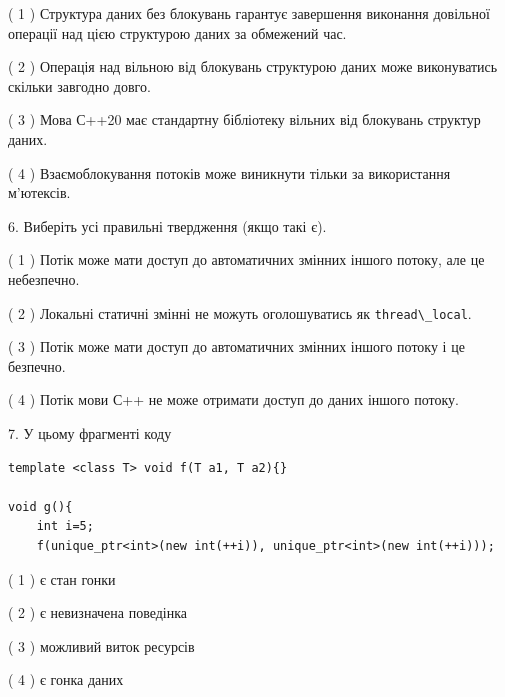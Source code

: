 \documentclass[12pt, ukrainian]{article}
\def\code#1{\Verb!#1!}
\begin{document}
\begin {large}
{( 1 ) Структура даних без блокувань гарантує завершення виконання довільної операції над цією структурою даних за обмежений час.%

( 2 ) Операція над вільною від блокувань структурою даних може виконуватись скільки завгодно довго.%

( 3 ) Мова С++20 має стандартну бібліотеку вільних від блокувань структур даних.%

( 4 ) Взаємоблокування потоків може виникнути тільки за використання м’ютексів.%
\newpage



\vspace{5mm}
6. Виберіть усі правильні твердження (якщо такі є).\par
\vspace{2mm}

( 1 ) Потік може мати доступ до автоматичних змінних іншого потоку, але це небезпечно.%

( 2 ) Локальні статичні змінні не можуть оголошуватись як \code{thread\_local}.%

( 3 ) Потік може мати доступ до автоматичних змінних іншого потоку і це безпечно.%

( 4 ) Потік мови С++ не може отримати доступ до даних іншого потоку.%


\vspace{5mm}
7. У цьому фрагменті коду
\begin{verbatim}
template <class T> void f(T a1, T a2){}

void g(){
    int i=5;
    f(unique_ptr<int>(new int(++i)), unique_ptr<int>(new int(++i)));
\end{verbatim}

( 1 ) є стан гонки%

( 2 ) є невизначена поведінка%

( 3 ) можливий виток ресурсів%

( 4 ) є гонка даних%
}
\end {large}
\end{document}
